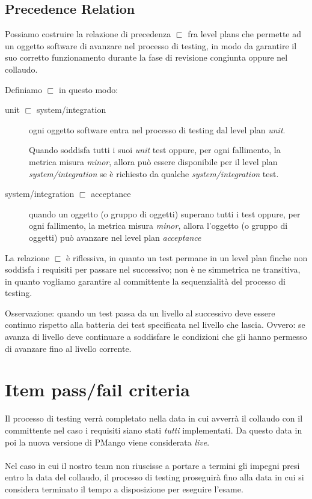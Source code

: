 \subsection{Precedence Relation}
Possiamo costruire la relazione di precedenza $\sqsubset$ fra level plans che
permette ad un oggetto software di avanzare nel processo di testing, in modo
da garantire il suo corretto funzionamento durante la fase di
revisione congiunta oppure nel collaudo. 

Definiamo $\sqsubset$ in questo modo: 
\begin{description}
  \item[unit $\sqsubset$ system/integration] ogni oggetto software entra nel 
processo di testing dal level plan \emph{unit}. 

Quando soddisfa tutti i suoi \emph{unit} test oppure, per ogni fallimento, la
metrica misura \emph{minor}, allora pu\`o essere disponibile per il level plan 
\emph{system/integration} se \`e richiesto da qualche \emph{system/integration}
test.
  \item[system/integration $\sqsubset$ acceptance] quando un oggetto (o gruppo
  di oggetti) superano tutti i test oppure, per ogni fallimento, la metrica 
  misura \emph{minor}, allora l'oggetto (o gruppo di oggetti) pu\`o avanzare
  nel level plan \emph{acceptance}
\end{description}
La relazione $\sqsubset$ \`e riflessiva, in quanto un test permane in un level
plan finche non soddisfa i requisiti per passare nel successivo; non \`e ne
simmetrica ne transitiva, in quanto vogliamo garantire al committente la
sequenzialit\`a del processo di testing.

Osservazione: quando un test passa da un livello al successivo deve essere
continuo rispetto alla batteria dei test specificata nel livello che lascia.
Ovvero: se avanza di livello deve continuare a soddisfare le condizioni che gli
hanno permesso di avanzare fino al livello corrente.



\section{Item pass/fail criteria}
Il processo di testing verr\`a completato nella data in cui avverr\`a il
collaudo con il committente nel caso i requisiti siano stati \emph{tutti}
implementati. Da questo data in poi la nuova versione di PMango viene
considerata \emph{live}. \\ \\
Nel caso in cui il nostro team non riuscisse a portare a termini
gli impegni presi entro la data del collaudo, il processo di testing
proseguir\`a fino alla data in cui si considera terminato il tempo a 
disposizione per eseguire l'esame.

